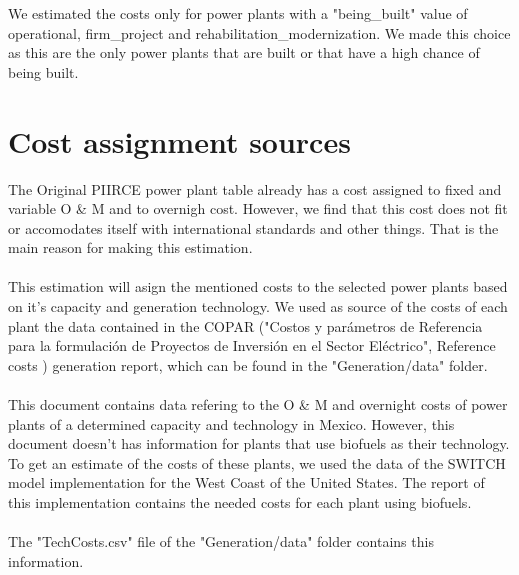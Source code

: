 \documentclass[letterpaper,12pt]{article}
\begin{document}
We estimated the costs only for power plants with a "being\_built" value of operational, firm\_project and rehabilitation\_modernization. We made this choice as this are the only power plants that are built or that have a high chance of being built.
\section{Cost assignment sources}
The Original PIIRCE power plant table already has a cost assigned to fixed and variable O \& M and to overnigh cost. However, we find that this cost does not fit or accomodates itself with international standards and other things. That is the main reason for making this estimation.
\\
\\This estimation will asign the mentioned costs to the selected power plants based on it's capacity and generation technology. We used as source of the costs of each plant the data contained in the COPAR ("Costos y parámetros de Referencia para la formulación de Proyectos de Inversión en el Sector Eléctrico", Reference costs ) generation report, which can be found in the "Generation/data" folder\cite{copar}.
\\
\\This document contains data refering to the O \& M and overnight costs of power plants of a determined capacity and technology in Mexico. However, this document doesn't has information for plants that use biofuels as their technology. To get an estimate of the costs of these plants, we used the data of the SWITCH model implementation for the West Coast of the United States. The report\cite{us} of this implementation contains the needed costs for each plant using biofuels.
\\
\\The "TechCosts.csv" file of the "Generation/data" folder contains this information.
\end{document}
